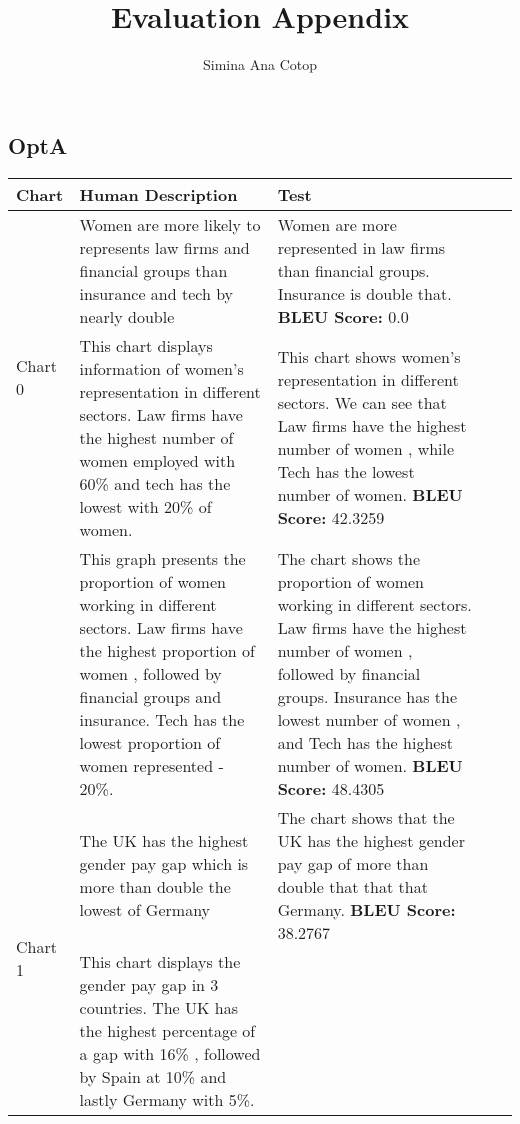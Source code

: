 \documentclass[]{article}
\title{Evaluation Appendix}
\author{Simina Ana Cotop}
\date{}
\begin{document}
    \begin{landscape}
    \maketitle
    \section{OptA}

	\begin{longtable}{|p{13mm}|p{57mm}|p{57mm}|p{57mm}|p{57mm}|}
	\hline 
	Chart & Human Description & Test  \\ 
	\hline 
	\endhead\multirow{2}{*}{Chart 0}&Women are more likely to represents law firms and financial groups than insurance and tech by nearly double 
 & Women are more represented in law firms than financial groups. Insurance is double that.
\newline \textbf{BLEU Score: }0.0\\ \cline{2-5}&This chart displays information of women's representation in different sectors. Law firms have the highest number of women employed with 60\% and tech has the lowest with 20\% of women. 
 & This chart shows women's representation in different sectors. We can see that Law firms have the highest number of women , while Tech has the lowest number of women.
\newline \textbf{BLEU Score: }42.3259\\ \cline{2-5}&This graph presents the proportion of women working in different  sectors. Law firms have the highest proportion of women , followed by financial groups and insurance. Tech has the lowest proportion of women represented - 20\%. 
 & The chart shows the proportion of women working in different  sectors. Law firms have the highest number of women , followed by financial groups. Insurance has the lowest number of women , and Tech has the highest number of women.
\newline \textbf{BLEU Score: }48.4305\\ \cline{2-5}\hline\multirow{2}{*}{Chart 1}&The UK has the highest gender pay gap which is more than double the lowest of Germany 
 & The chart shows that the UK has the highest gender pay gap of more than double that that that Germany.
\newline \textbf{BLEU Score: }38.2767\\ \cline{2-5}&This chart displays the gender pay gap in 3 countries. The UK has the highest percentage of a gap with 16\% , followed by Spain at 10\% and lastly Germany with 5\%. 

\end{longtable}
\end{landscape}
\end{document}
